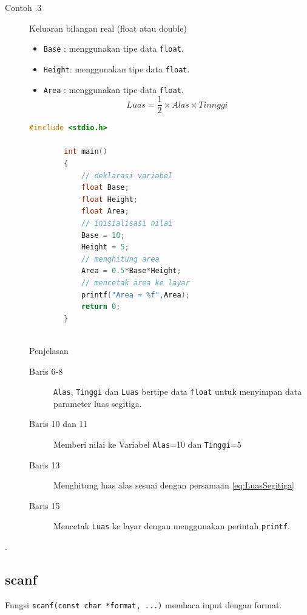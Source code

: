 \begin{description}
	\item[Contoh \thesubsection.3] Keluaran bilangan real (float atau double)
		\begin{itemize}
			\item \verb|Base|  : menggunakan tipe data \verb|float|.
			\item \verb|Height|: menggunakan tipe data \verb|float|.
			\item \verb|Area|  : menggunakan tipe data \verb|float|.
			      \begin{equation}\label{eq:LuasSegitiga}
				      Luas = \frac{1}{2} \times Alas \times Tinnggi
			      \end{equation}
		\end{itemize}
		\begin{lstlisting}[language=c,captionpos=t]
		#include <stdio.h>
		
		int main()
		{
			// deklarasi variabel
			float Base;
			float Height;
			float Area;
			// inisialisasi nilai
			Base = 10;
			Height = 5;
			// menghitung area
			Area = 0.5*Base*Height;
			// mencetak area ke layar
			printf("Area = %f",Area);
			return 0;
		}
		
	\end{lstlisting}

		Penjelasan
		\begin{description}
			\item[Baris 6-8]  \verb|Alas|, \verb|Tinggi| dan \verb|Luas| bertipe data \verb|float| untuk menyimpan data parameter luas segitiga.
			\item[Baris 10 dan 11] Memberi nilai ke Variabel \verb|Alas|=10 dan \verb|Tinggi|=5
			\item[Baris 13] Menghitung luas alas sesuai dengan persamaan \ref{eq:LuasSegitiga}
			\item[Baris 15] Mencetak \verb|Luas| ke layar dengan menggunakan perintah \verb|printf|.
		\end{description}
\end{description}

.\subsection{scanf}
Fungsi  \verb*|scanf(const char *format, ...)| membaca input dengan format.

